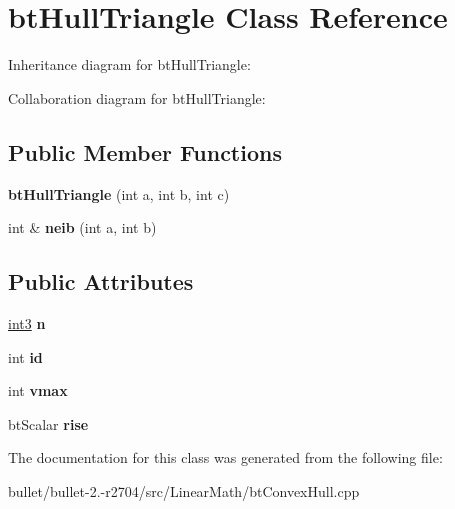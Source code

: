 \hypertarget{classbt_hull_triangle}{\section{bt\+Hull\+Triangle Class Reference}
\label{classbt_hull_triangle}
}


Inheritance diagram for bt\+Hull\+Triangle\+:


Collaboration diagram for bt\+Hull\+Triangle\+:
\subsection*{Public Member Functions}
\begin{DoxyCompactItemize}
\item 
\hypertarget{classbt_hull_triangle_ad7fd692541a77a50e5a549b51018cf32}{{\bfseries bt\+Hull\+Triangle} (int a, int b, int c)}\label{classbt_hull_triangle_ad7fd692541a77a50e5a549b51018cf32}

\item 
\hypertarget{classbt_hull_triangle_a85baf5520041d90f16f6972c57b8391c}{int \& {\bfseries neib} (int a, int b)}\label{classbt_hull_triangle_a85baf5520041d90f16f6972c57b8391c}

\end{DoxyCompactItemize}
\subsection*{Public Attributes}
\begin{DoxyCompactItemize}
\item 
\hypertarget{classbt_hull_triangle_a7b331b1599802661ec0136c158ceef8e}{\hyperlink{structint3}{int3} {\bfseries n}}\label{classbt_hull_triangle_a7b331b1599802661ec0136c158ceef8e}

\item 
\hypertarget{classbt_hull_triangle_a131cd475bc98a0d8fa4173f0b32f5a52}{int {\bfseries id}}\label{classbt_hull_triangle_a131cd475bc98a0d8fa4173f0b32f5a52}

\item 
\hypertarget{classbt_hull_triangle_a03dbc3a52bbc6bc45cc13b46458560b7}{int {\bfseries vmax}}\label{classbt_hull_triangle_a03dbc3a52bbc6bc45cc13b46458560b7}

\item 
\hypertarget{classbt_hull_triangle_a4c20aac7e01e6b137db387c7059160e6}{bt\+Scalar {\bfseries rise}}\label{classbt_hull_triangle_a4c20aac7e01e6b137db387c7059160e6}

\end{DoxyCompactItemize}


The documentation for this class was generated from the following file\+:\begin{DoxyCompactItemize}
\item 
bullet/bullet-\/2.-\/r2704/src/\+Linear\+Math/bt\+Convex\+Hull.\+cpp\end{DoxyCompactItemize}
